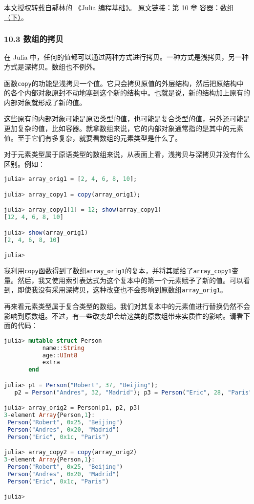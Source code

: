 
本文授权转载自郝林的 《Julia 编程基础》。 原文链接：\href{https://github.com/hyper0x/JuliaBasics/blob/master/book/ch10.md}{第 10 章 容器：数组（下）}。


\subsubsection{10.3 数组的拷贝}

在 Julia 中，任何的值都可以通过两种方式进行拷贝。一种方式是浅拷贝，另一种方式是深拷贝。数组也不例外。

函数\verb`copy`的功能是浅拷贝一个值。它只会拷贝原值的外层结构，然后把原结构中的各个内部对象原封不动地塞到这个新的结构中。也就是说，新的结构加上原有的内部对象就形成了新的值。

这些原有的内部对象可能是原语类型的值，也可能是复合类型的值，另外还可能是更加复杂的值，比如容器。就拿数组来说，它的内部对象通常指的是其中的元素值。至于它们有多复杂，就要看数组的元素类型是什么了。

对于元素类型属于原语类型的数组来说，从表面上看，浅拷贝与深拷贝并没有什么区别。例如：

\begin{lstlisting}[language=julia]
julia> array_orig1 = [2, 4, 6, 8, 10];

julia> array_copy1 = copy(array_orig1);

julia> array_copy1[1] = 12; show(array_copy1)
[12, 4, 6, 8, 10]

julia> show(array_orig1)
[2, 4, 6, 8, 10]

julia> 
\end{lstlisting}

我利用\verb`copy`函数得到了数组\verb`array_orig1`的复本，并将其赋给了\verb`array_copy1`变量。然后，我又使用索引表达式为这个复本中的第一个元素赋予了新的值。可以看到，即使我没有采用深拷贝，这种改变也不会影响到原数组\verb`array_orig1`。

再来看元素类型属于复合类型的数组。我们对其复本中的元素值进行替换仍然不会影响到原数组。不过，有一些改变却会给这类的原数组带来实质性的影响。请看下面的代码：

\begin{lstlisting}[language=julia]
julia> mutable struct Person
           name::String
           age::UInt8
           extra
       end

julia> p1 = Person("Robert", 37, "Beijing");
   p2 = Person("Andres", 32, "Madrid"); p3 = Person("Eric", 28, "Paris");

julia> array_orig2 = Person[p1, p2, p3]
3-element Array{Person,1}:
 Person("Robert", 0x25, "Beijing")
 Person("Andres", 0x20, "Madrid") 
 Person("Eric", 0x1c, "Paris")    

julia> array_copy2 = copy(array_orig2)
3-element Array{Person,1}:
 Person("Robert", 0x25, "Beijing")
 Person("Andres", 0x20, "Madrid") 
 Person("Eric", 0x1c, "Paris")    

julia> 
\end{lstlisting}

